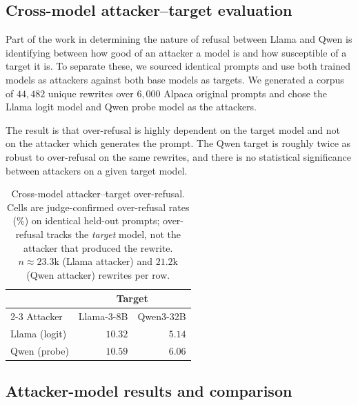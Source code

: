 \documentclass{article}
\begin{document}
\subsection{Cross-model attacker--target evaluation}
Part of the work in determining the nature of refusal between Llama and Qwen is identifying between how good of an attacker a model is and how susceptible of a target it is. To separate these, we sourced identical prompts and use both trained models as attackers against both base models as targets. We generated a corpus of $44{,}482$ unique rewrites over $6{,}000$ Alpaca original prompts and chose the Llama logit model and Qwen probe model as the attackers. 

The result is that over-refusal is highly dependent on the target model and not on the attacker which generates the prompt. The Qwen target is roughly twice as  robust to over-refusal on the same rewrites, and there is no statistical significance between attackers on a given target model. 

 
\begin{table}[t]
  \centering
  \caption{Cross-model attacker--target over-refusal. Cells are judge-confirmed over-refusal rates (\%) on identical held-out prompts; over-refusal tracks the \emph{target} model, not the attacker that produced the rewrite. $n\!\approx\!23.3$k (Llama attacker) and $21.2$k (Qwen attacker) rewrites per row.}
  \label{tab:cross_model}
  \begin{tabular}{lrr}
    \toprule
     & \multicolumn{2}{c}{Target} \\
    \cmidrule(lr){2-3}
    Attacker & Llama-3-8B & Qwen3-32B \\
    \midrule
    Llama (logit) & $10.32$ & $5.14$ \\
    Qwen (probe)  & $10.59$ & $6.06$ \\
    \bottomrule
  \end{tabular}
\end{table}
 
\subsection{Attacker-model results and comparison}
\end{document}
